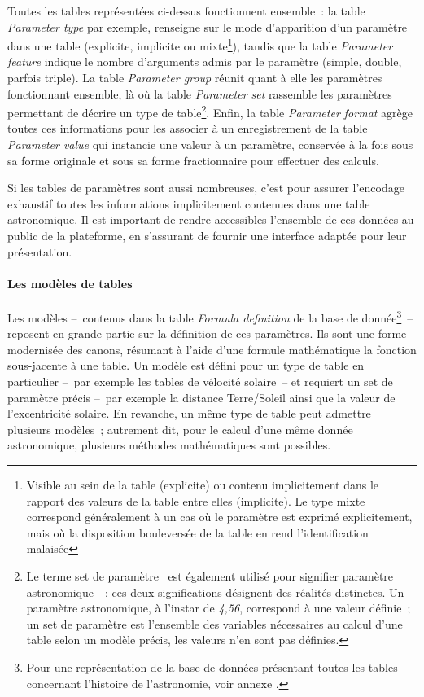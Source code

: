 \documentclass[a4paper,12pt,twoside]{book}
\newcommand{\eng}{\emph}
\newcommand{\g}[1]{\og#1~\fg}
\begin{document}
Toutes les tables représentées ci-dessus fonctionnent ensemble~: la table \eng{Parameter type} par exemple, renseigne sur le mode d'apparition d'un paramètre dans une table (explicite, implicite ou mixte\footnote{Visible au sein de la table (explicite) ou contenu implicitement dans le rapport des valeurs de la table entre elles (implicite). Le type mixte correspond généralement à un cas où le paramètre est exprimé explicitement, mais où la disposition bouleversée de la table en rend l'identification malaisée}), tandis que la table \eng{Parameter feature} indique le nombre d'arguments admis par le paramètre (simple, double, parfois triple). La table \eng{Parameter group} réunit quant à elle les paramètres fonctionnant ensemble, là où la table \eng{Parameter set} rassemble les paramètres permettant de décrire un type de table\footnote{Le terme \g{set de paramètre} est également utilisé pour signifier \g{paramètre astronomique}~: ces deux significations désignent des réalités distinctes. Un paramètre astronomique, à l'instar de \emph{4,56}, correspond à une valeur définie~; un set de paramètre est l'ensemble des variables nécessaires au calcul d'une table selon un modèle précis, les valeurs n'en sont pas définies.}. Enfin, la table \eng{Parameter format} agrège toutes ces informations pour les associer à un enregistrement de la table \eng{Parameter value} qui instancie une valeur à un paramètre, conservée à la fois sous sa forme originale et sous sa forme fractionnaire pour effectuer des calculs.

Si les tables de paramètres sont aussi nombreuses, c'est pour assurer l'encodage exhaustif toutes les informations implicitement contenues dans une table astronomique. Il est important de rendre accessibles l'ensemble de ces données au public de la plateforme, en s'assurant de fournir une interface adaptée pour leur présentation.

				\paragraph{\label{FormulaDefinition}Les modèles de tables}
Les modèles –~contenus dans la table \eng{Formula definition} de la base de donnée\footnote{Pour une représentation de la base de données présentant toutes les tables concernant l'histoire de l'astronomie, voir annexe \pageref{BaseDeDonnee}.}~– reposent en grande partie sur la définition de ces paramètres. Ils sont une forme modernisée des canons, résumant à l'aide d'une formule mathématique la fonction sous-jacente à une table. Un modèle est défini pour un type de table en particulier –~par exemple les tables de vélocité solaire~– et requiert un set de paramètre précis –~par exemple la distance Terre/Soleil ainsi que la valeur de l'excentricité solaire. En revanche, un même type de table peut admettre plusieurs modèles~; autrement dit, pour le calcul d'une même donnée astronomique, plusieurs méthodes mathématiques sont possibles.
\end{document}
